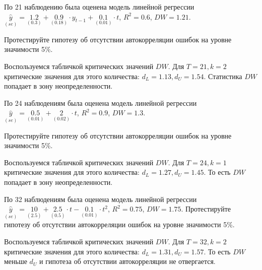 \begin{problem}
По 21 наблюдению была оценена модель линейной регрессии
$\underset{(se)}{\hat{y}}=\underset{(0.3)}{1.2}+\underset{(0.18)}{0.9}\cdot y_{t-1}+\underset{(0.01)}{0.1}\cdot t$, $R^2=0.6$, $DW=1.21$. 

Протестируйте гипотезу об отсутствии автокорреляции ошибок на уровне значимости 5\%.

\begin{sol}
  Воспользуемся табличкой критических значений $DW$. 
Для $T = 21, k = 2$ критические значения для этого количества: $d_L = 1.13, d_U = 1.54$. 
Статистика $DW$ попадает в зону неопределенности.
\end{sol}
\end{problem}



\begin{problem}
По 24 наблюдениям была оценена модель линейной регрессии
$\underset{(se)}{\hat{y}}=\underset{(0.01)}{0.5}+\underset{(0.02)}{2}\cdot t$, $R^2=0.9$, $DW=1.3$. 

Протестируйте гипотезу об отсутствии автокорреляции ошибок на уровне значимости 5\%.

\begin{sol}
  Воспользуемся табличкой критических значений $DW$. 
Для $T = 24, k = 1$ критические значения для этого количества: $d_L = 1.27, d_U = 1.45$. 
То есть $DW$ попадает в зону неопределенности.
\end{sol}
\end{problem}



\begin{problem}
По 32 наблюдениям была оценена модель линейной регрессии
$\underset{(se)}{\hat{y}}=\underset{(2.5)}{10}+\underset{(0.5)}{2.5}\cdot t- \underset{(0.01)}{0.1}\cdot t^2$, $R^2=0.75$, $DW=1.75$. Протестируйте гипотезу об отсутствии автокорреляции ошибок на уровне значимости 5\%.

\begin{sol}
  Воспользуемся табличкой критических значений $DW$. 
Для $T = 32, k = 2$ критические значения для этого количества: $d_L = 1.31, d_U = 1.57$. 
То есть $DW$ меньше  $d_U$ и гипотеза об отсутствии автокорреляции не отвергается.
\end{sol}
\end{problem}


